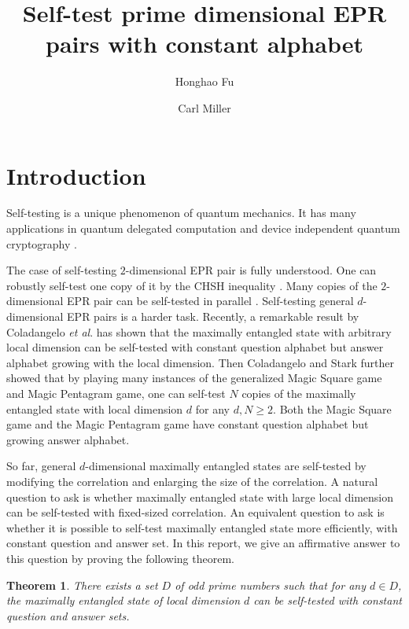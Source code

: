 \documentclass[11pt,letterpaper]{article}
\newcommand{\1}{\mathbb{1}}
\newtheorem{theorem}{Theorem}
\theoremstyle{definition}
\begin{document}
\title{Self-test prime dimensional EPR pairs with constant alphabet}

\author[1]{Honghao Fu}
\author[1,2]{Carl Miller}

\renewcommand\Affilfont{\itshape\small}


\maketitle

\section{Introduction}
\label{sec:intro}
Self-testing is a unique phenomenon of quantum mechanics. It has many applications in quantum
delegated computation \cite{ruv2013,cgsv2017} and device independent quantum cryptography
\cite{qkd2011,qkd2014,miller2016,fu2018,eat2018}.

The case of self-testing $2$-dimensional EPR pair is fully understood. One can robustly self-test
one copy of it by the CHSH inequality \cite{bamps2015}. Many copies of the $2$-dimensional EPR
pair can be self-tested in parallel \cite{mckague2016, coladan2017parallel}. 
Self-testing general $d$-dimensional EPR pairs is a harder task.
Recently, a remarkable result by Coladangelo \textit{et al}.\cite{cgs2017} 
has shown that the maximally entangled state with arbitrary local dimension 
can be self-tested with constant question alphabet but answer alphabet growing with
the local dimension. 
Then Coladangelo and Stark \cite{coladan2017} further showed that by playing many instances
of the generalized Magic Square game and Magic Pentagram game, one can self-test
$N$ copies of the maximally entangled state with local dimension $d$ for any $d, N \geq 2$.
Both the Magic Square game and the Magic Pentagram game have constant question alphabet
but growing answer alphabet.

So far, general $d$-dimensional maximally entangled states are self-tested by
modifying the correlation and enlarging the size of the correlation.
A natural question to ask is whether maximally entangled state with large local dimension
can be self-tested with fixed-sized correlation. 
An equivalent question to ask is whether it is possible to self-test maximally
entangled state more efficiently, with constant question and answer set. 
In this report, we give an affirmative answer to this question by proving the following theorem.
\begin{theorem}
\label{thm:inf}
	There exists a set $D$ of odd prime numbers such that for any $d \in D$, 
	the maximally entangled state of local dimension $d$ can be self-tested 
	with constant question and answer sets.
\end{theorem}
\end{document}
